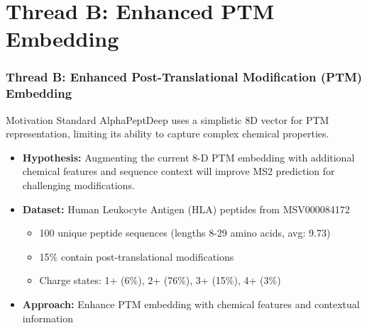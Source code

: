\documentclass{beamer}
\begin{document}
\section{Thread B: Enhanced PTM Embedding}
\begin{frame}
  \frametitle{Thread B: Enhanced Post-Translational Modification (PTM) Embedding}
  \begin{block}{Motivation}
    Standard AlphaPeptDeep uses a simplistic 8D vector for PTM representation, limiting its ability to capture complex chemical properties.
  \end{block}
  \begin{itemize}
    \item \textbf{Hypothesis:} Augmenting the current 8-D PTM embedding with additional chemical features and sequence context will improve MS2 prediction for challenging modifications.
    \item \textbf{Dataset:} Human Leukocyte Antigen (HLA) peptides from MSV000084172
    \begin{itemize}
      \item 100 unique peptide sequences (lengths 8-29 amino acids, avg: 9.73)
      \item 15\% contain post-translational modifications
      \item Charge states: 1+ (6\%), 2+ (76\%), 3+ (15\%), 4+ (3\%)
    \end{itemize}
    \item \textbf{Approach:} Enhance PTM embedding with chemical features and contextual information
  \end{itemize}
\end{frame}
\end{document}
